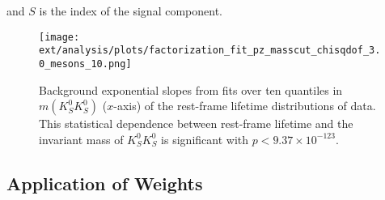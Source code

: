 and $S$ is the index of the signal component.


\begin{figure}
  \begin{center}
    \texttt{[image: ext/analysis/plots/factorization\_fit\_pz\_masscut\_chisqdof\_3.0\_mesons\_10.png]}
  \end{center}
  \caption{Background exponential slopes from fits over ten quantiles in $m(K_S^0K_S^0)$ ($x$-axis) of the rest-frame lifetime distributions of data. This statistical dependence between rest-frame lifetime and the invariant mass of $K_S^0K_S^0$ is significant with $p < 9.37\times 10^{-123}$.}\label{fig:factorization}
\end{figure}



\subsection{Application of Weights}\label{sec:application-of-weights}

